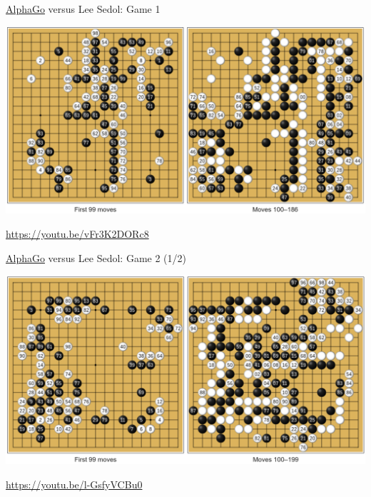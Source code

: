 \documentclass{beamer}
\begin{document}
  {

    \begin{frame}{{\color{white}\underline{AlphaGo}} versus {\color{black}Lee Sedol}: Game 1}
      \begin{center}
        \includegraphics[width=\textwidth]{../img/AlphaGo_vs_Lee_Sedol_Game_1.png}

        \url{https://youtu.be/vFr3K2DORc8}
      \end{center}
    \end{frame}

    \begin{frame}{{\color{black}\underline{AlphaGo}} versus {\color{white}Lee Sedol}: Game 2 (1/2)}
      \begin{center}
        \includegraphics[width=\textwidth]{../img/AlphaGo_vs_Lee_Sedol_Game_2a.png}

        \url{https://youtu.be/l-GsfyVCBu0}
      \end{center}
    \end{frame}

}
\end{document}
